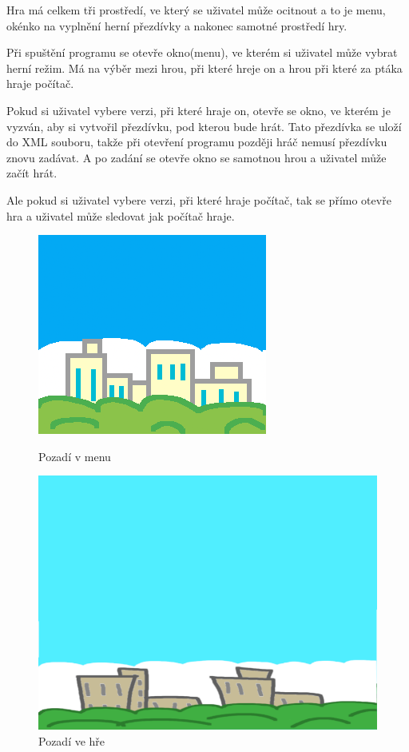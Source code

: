 Hra má celkem tři prostředí, ve který se uživatel může ocitnout a to je menu, okénko na vyplnění herní přezdívky a nakonec samotné prostředí hry.

Při spuštění programu se otevře okno(menu), ve kterém si uživatel může vybrat herní režim. Má na výběr mezi hrou, při které hreje on a hrou při které za ptáka hraje počítač. 

Pokud si uživatel vybere verzi, při které hraje on, otevře se okno, ve kterém je vyzván, aby si vytvořil přezdívku, pod kterou bude hrát. Tato přezdívka se uloží do XML souboru, takže při otevření programu později hráč nemusí přezdívku znovu zadávat. A po zadání se otevře okno se samotnou hrou a uživatel může začít hrát.

Ale pokud si uživatel vybere verzi, při které hraje počítač, tak se přímo otevře hra a uživatel může sledovat jak počítač hraje. 
\begin{figure}[!htb]
   \begin{minipage}{0.48\textwidth}
     \centering
     \includegraphics[width=.7\linewidth]{images/MenuBackground.png}
     \caption{Pozadí v menu}\label{Fig:Data1}
   \end{minipage}\hfill
   \begin{minipage}{0.5\textwidth}
     \centering
     \includegraphics[width=.7\linewidth]{images/MainBackground.png}
     \caption{Pozadí ve hře}\label{Fig:Data2}
   \end{minipage}
\end{figure}

